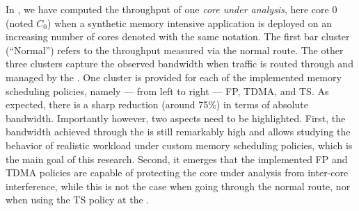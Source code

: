 In , we have computed the throughput of
one \emph{core under analysis}, here core 0 (noted $C_{0}$) when a
synthetic memory intensive application is deployed on an increasing
number of cores denoted with the same notation. The first bar cluster
(``Normal'') refers to the throughput measured via the normal
route. The other three clusters capture the observed bandwidth when
traffic is routed through and managed by the \schim. One cluster is
provided for each of the implemented memory scheduling policies,
namely --- from left to right --- FP, TDMA, and TS. As expected, there
is a sharp reduction (around 75\%) in terms of absolute
bandwidth. Importantly however, two aspects need to be
highlighted. First, the bandwidth achieved through the \schim is still
remarkably high and allows studying the behavior of realistic workload
under custom memory scheduling policies, which is the main goal of
this research. Second, it emerges that the implemented FP and TDMA
policies are capable of protecting the core under analysis from
inter-core interference, while this is not the case when going through
the normal route, nor when using the TS policy at the \schim.




